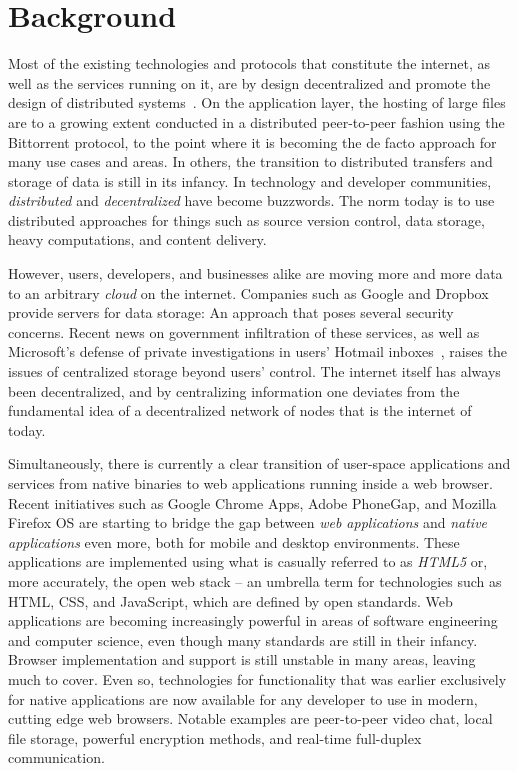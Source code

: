 \section{Background}

Most of the existing technologies and protocols that constitute the internet, as well as the services running on it, are by design decentralized and promote the design of distributed systems~\cite{InternetDecenterlized:Online}. On the application layer, the hosting of large files are to a growing extent conducted in a distributed peer-to-peer fashion using the Bittorrent protocol, to the point where it is becoming the de facto approach for many use cases and areas. In others, the transition to distributed transfers and storage of data is still in its infancy. In technology and developer communities, \emph{distributed} and \emph{decentralized} have become buzzwords. The norm today is to use distributed approaches for things such as source version control, data storage, heavy computations, and content delivery.

However, users, developers, and businesses alike are moving more and more data to an arbitrary \emph{cloud} on the internet. Companies such as Google and Dropbox provide servers for data storage: An approach that poses several security concerns. Recent news on government infiltration of these services, as well as Microsoft's defense of private investigations in users' Hotmail inboxes~\cite{Frank:2014}, raises the issues of centralized storage beyond users' control. The internet itself has always been decentralized, and by centralizing information one deviates from the fundamental idea of a decentralized network of nodes that is the internet of today.

Simultaneously, there is currently a clear transition of user-space applications and services from native binaries to web applications running inside a web browser. Recent initiatives such as Google Chrome Apps, Adobe PhoneGap, and Mozilla Firefox OS are starting to bridge the gap between \emph{web applications} and \emph{native applications} even more, both for mobile and desktop environments. These applications are implemented using what is casually referred to as \emph{HTML5} or, more accurately, the open web stack – an umbrella term for technologies such as HTML, CSS, and JavaScript, which are defined by open standards. Web applications are becoming increasingly powerful in areas of software engineering and computer science, even though many standards are still in their infancy. Browser implementation and support is still unstable in many areas, leaving much to cover. Even so, technologies for functionality that was earlier exclusively for native applications are now available for any developer to use in modern, cutting edge web browsers. Notable examples are peer-to-peer video chat, local file storage, powerful encryption methods, and real-time full-duplex communication.

